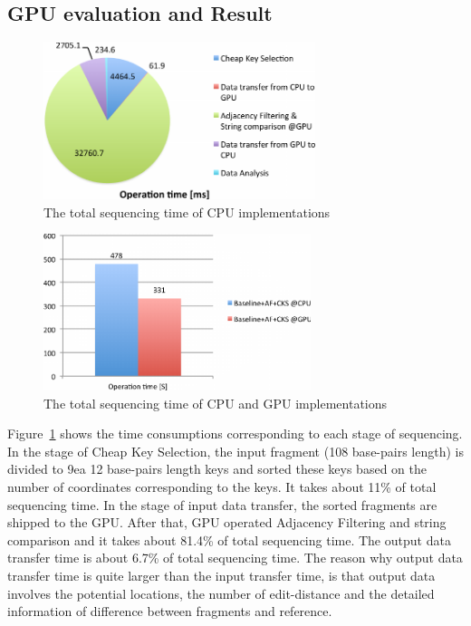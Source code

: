 \subsection{GPU evaluation and Result} 

\begin{figure}[t] \centering
\vspace{0.1in}
\includegraphics[height=1.8in]{./figure/GPU_portion_B.pdf} \vspace{-0.2in}
\caption{The total sequencing time of CPU implementations}
\label{fig:gpu_portion} 
\end{figure}
\begin{figure}[b] \centering
\vspace{0.15in}
\includegraphics[height=1.8in]{./figure/GPU_Result_B.pdf} \vspace{0in}
\caption{The total sequencing time of CPU and GPU implementations}
\label{fig:gpu_result} 
\end{figure}

Figure~\ref{fig:gpu_portion} shows the time consumptions corresponding to each stage of
sequencing. In the stage of Cheap Key Selection, the input fragment (108
base-pairs length) is divided to 9ea 12 base-pairs length keys and sorted these
keys based on the number of coordinates corresponding to the keys. It takes
about 11\% of total sequencing time. In the stage of input data transfer, the
sorted fragments are shipped to the GPU. After that, GPU operated Adjacency
Filtering and string comparison and it takes about 81.4\% of total sequencing
time. The output data transfer time is about 6.7\% of total sequencing time. The
reason why output data transfer time is quite larger than the input transfer
time, is that output data involves the potential locations, the number of
edit-distance and the detailed information of difference between fragments and
reference.\\

